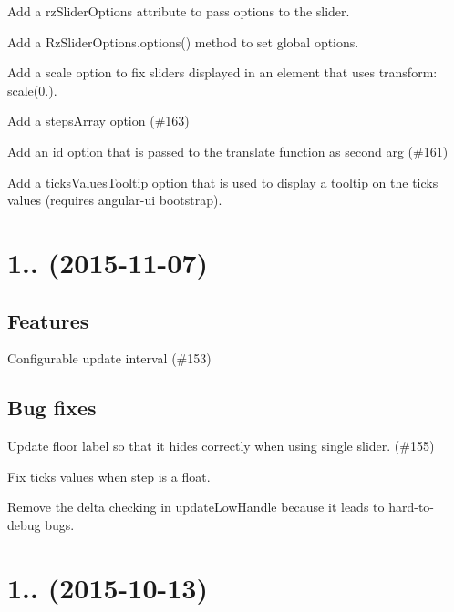\begin{DoxyItemize}
\item Add a {\ttfamily rz\+Slider\+Options} attribute to pass options to the slider.
\item Add a {\ttfamily Rz\+Slider\+Options.\+options()} method to set global options.
\item Add a {\ttfamily scale} option to fix sliders displayed in an element that uses {\ttfamily transform\+: scale(0.)}.
\item Add a {\ttfamily steps\+Array} option (\#163)
\item Add an {\ttfamily id} option that is passed to the translate function as second arg (\#161)
\item Add a {\ttfamily ticks\+Values\+Tooltip} option that is used to display a tooltip on the ticks values (requires angular-\/ui bootstrap).
\end{DoxyItemize}

\section*{1.. (2015-\/11-\/07)}

\subsection*{Features}


\begin{DoxyItemize}
\item Configurable update interval (\#153)
\end{DoxyItemize}

\subsection*{Bug fixes}


\begin{DoxyItemize}
\item Update floor label so that it hides correctly when using single slider. (\#155)
\item Fix ticks values when step is a float.
\item Remove the delta checking in update\+Low\+Handle because it leads to hard-\/to-\/debug bugs.
\end{DoxyItemize}

\section*{1.. (2015-\/10-\/13)}


